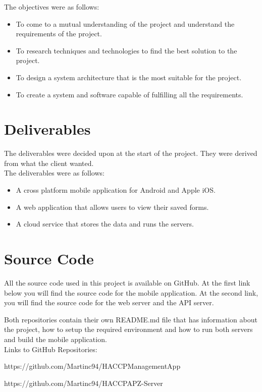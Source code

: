 The objectives were as follows:

\begin{itemize}
\item To come to a mutual understanding of the project and understand the requirements of the project.
\item To research techniques and technologies to find the best solution to the project.
\item To design a system architecture that is the most suitable for the project.
\item To create a system and software capable of fulfilling all the requirements.
\end{itemize}

\section{Deliverables}
The deliverables were decided upon at the start of the project. They were derived from what the client wanted. \\

The deliverables were as follows:
\begin{itemize}
\item A cross platform mobile application for Android and Apple iOS.
\item A web application that allows users to view their saved forms.
\item A cloud service that stores the data and runs the servers.
\end{itemize}

\section{Source Code}
All the source code used in this project is available on GitHub. At the first link below you will find the source code for the mobile application. At the second link, you will find the source code for the web server and the API server.

Both repositories contain their own README.md file that has information about the project, how to setup the required environment and how to run both servers and build the mobile application.\\

Links to GitHub Repositories:

https://github.com/Martinc94/HACCPManagementApp

https://github.com/Martinc94/HACCPAPZ-Server


